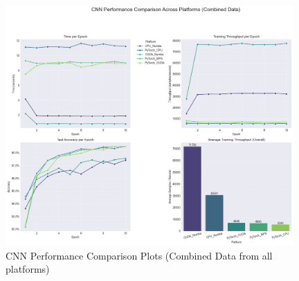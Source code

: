 \documentclass[conference]{IEEEtran} %
\begin{document}
\begin{figure}[htbp]
    \centering
    \includegraphics[width=0.98\textwidth]{results/comparison_plot_combined.png}
    \caption{CNN Performance Comparison Plots (Combined Data from all platforms)}
    \label{fig:results_plots}
    \vspace{0.1cm}
\end{figure}
\end{document}
